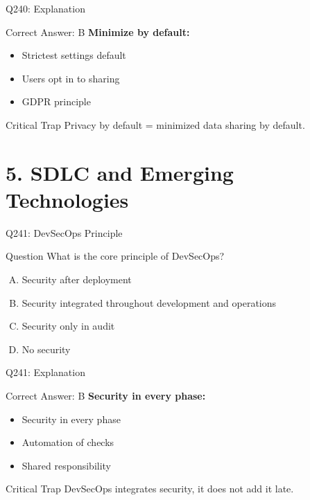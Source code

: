\documentclass{beamer}
\begin{document}
	\begin{frame}{Q240: Explanation}
		\begin{block}{Correct Answer: B}
			\textbf{Minimize by default:}
			\begin{itemize}
				\item Strictest settings default
				\item Users opt in to sharing
				\item GDPR principle
			\end{itemize}
		\end{block}
		\begin{alertblock}{Critical Trap}
			Privacy by default = minimized data sharing by default.
		\end{alertblock}
	\end{frame}
	
	\section{5. SDLC and Emerging Technologies}
	
	\begin{frame}{Q241: DevSecOps Principle}
		\begin{block}{Question}
			What is the core principle of DevSecOps?
		\end{block}
		\begin{enumerate}[(A)]
			\item Security after deployment
			\item Security integrated throughout development and operations
			\item Security only in audit
			\item No security
		\end{enumerate}
	\end{frame}
	
	\begin{frame}{Q241: Explanation}
		\begin{block}{Correct Answer: B}
			\textbf{Security in every phase:}
			\begin{itemize}
				\item Security in every phase
				\item Automation of checks
				\item Shared responsibility
			\end{itemize}
		\end{block}
		\begin{alertblock}{Critical Trap}
			DevSecOps integrates security, it does not add it late.
		\end{alertblock}
	\end{frame}
	
\end{document}
